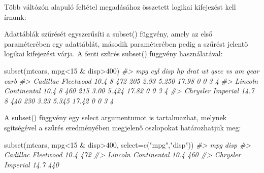 \documentclass[
]{book}
\newenvironment{Shaded}{\begin{snugshade}}{\end{snugshade}}
\newcommand{\AttributeTok}[1]{\textcolor[rgb]{0.77,0.63,0.00}{#1}}
\newcommand{\CommentTok}[1]{\textcolor[rgb]{0.56,0.35,0.01}{\textit{#1}}}
\newcommand{\DecValTok}[1]{\textcolor[rgb]{0.00,0.00,0.81}{#1}}
\newcommand{\FunctionTok}[1]{\textcolor[rgb]{0.00,0.00,0.00}{#1}}
\newcommand{\NormalTok}[1]{#1}
\newcommand{\SpecialCharTok}[1]{\textcolor[rgb]{0.00,0.00,0.00}{#1}}
\newcommand{\StringTok}[1]{\textcolor[rgb]{0.31,0.60,0.02}{#1}}
\begin{document}
Több váltózón alapuló feltétel megadásához összetett logikai kifejezést kell írnunk:

\begin{Shaded}
\end{Shaded}

Adattáblák szűrését egyszerűsíti a subset() függvény, amely az első paraméterében egy adattáblát, második paraméterében pedig a szűrést jelentő logikai kifejezést várja. A fenti szűrés subset() függvény használatával:

\begin{Shaded}
\begin{Highlighting}[]
\FunctionTok{subset}\NormalTok{(mtcars, mpg}\SpecialCharTok{\textless{}}\DecValTok{15} \SpecialCharTok{\&}\NormalTok{ disp}\SpecialCharTok{\textgreater{}}\DecValTok{400}\NormalTok{)}
\CommentTok{\#\textgreater{}                      mpg cyl disp  hp drat    wt  qsec vs am gear carb}
\CommentTok{\#\textgreater{} Cadillac Fleetwood  10.4   8  472 205 2.93 5.250 17.98  0  0    3    4}
\CommentTok{\#\textgreater{} Lincoln Continental 10.4   8  460 215 3.00 5.424 17.82  0  0    3    4}
\CommentTok{\#\textgreater{} Chrysler Imperial   14.7   8  440 230 3.23 5.345 17.42  0  0    3    4}
\end{Highlighting}
\end{Shaded}

A subset() függvény egy select argumentumot is tartalmazhat, melynek sgítségével a szűrés eredményében megjelenő oszlopokat határozhatjuk meg:

\begin{Shaded}
\begin{Highlighting}[]
\FunctionTok{subset}\NormalTok{(mtcars, mpg}\SpecialCharTok{\textless{}}\DecValTok{15} \SpecialCharTok{\&}\NormalTok{ disp}\SpecialCharTok{\textgreater{}}\DecValTok{400}\NormalTok{, }\AttributeTok{select=}\FunctionTok{c}\NormalTok{(}\StringTok{"mpg"}\NormalTok{,}\StringTok{"disp"}\NormalTok{))}
\CommentTok{\#\textgreater{}                      mpg disp}
\CommentTok{\#\textgreater{} Cadillac Fleetwood  10.4  472}
\CommentTok{\#\textgreater{} Lincoln Continental 10.4  460}
\CommentTok{\#\textgreater{} Chrysler Imperial   14.7  440}
\end{Highlighting}
\end{Shaded}
\end{document}
